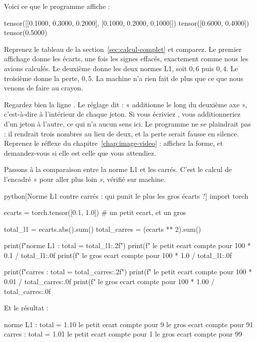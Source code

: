 Voici ce que le programme affiche :

\begin{sortie}
tensor([[0.1000, 0.3000, 0.2000],
        [0.1000, 0.2000, 0.1000]])
tensor([0.6000, 0.4000])
tensor(0.5000)
\end{sortie}

Reprenez le tableau de la section~\ref{sec:calcul-complet} et comparez. Le premier affichage donne
les écarts, une fois les signes effacés, exactement comme nous les avions
calculés. Le deuxième donne les deux normes L1, soit $0{,}6$ puis $0{,}4$.
Le troisième donne la perte, $0{,}5$. La machine n'a rien fait de plus que
ce que nous venons de faire au crayon.

\begin{piege}
Regardez bien la ligne . Le réglage
 dit : « additionne le long du deuxième axe », c'est-à-dire
à l'intérieur de chaque jeton. Si vous écriviez , vous
additionneriez d'un jeton à l'autre, ce qui n'a aucun sens ici. Le
programme ne se plaindrait pas : il rendrait trois nombres au lieu de deux,
et la perte serait fausse en silence. Reprenez le réflexe du
chapitre~\ref{chap:image-video} : affichez la forme, et demandez-vous si
elle est celle que vous attendiez.
\end{piege}

Passons à la comparaison entre la norme L1 et les carrés. C'est le calcul de
l'encadré « pour aller plus loin », vérifié sur machine.

\begin{code}{python}[Norme L1 contre carrés : qui punit le plus les gros écarts ?]
import torch

ecarts = torch.tensor([0.1, 1.0])     # un petit ecart, et un gros

total_l1     = ecarts.abs().sum()
total_carres = (ecarts ** 2).sum()

print(f"norme L1 : total = {total_l1:.2f}")
print(f"   le petit ecart compte pour {100 * 0.1 / total_l1:.0f} %
print(f"   le gros  ecart compte pour {100 * 1.0 / total_l1:.0f} %

print(f"carres   : total = {total_carres:.2f}")
print(f"   le petit ecart compte pour {100 * 0.01 / total_carres:.0f} %
print(f"   le gros  ecart compte pour {100 * 1.00 / total_carres:.0f} %
\end{code}

Et le résultat :

\begin{sortie}
norme L1 : total = 1.10
   le petit ecart compte pour 9 %
   le gros  ecart compte pour 91 %
carres   : total = 1.01
   le petit ecart compte pour 1 %
   le gros  ecart compte pour 99 %
\end{sortie}

